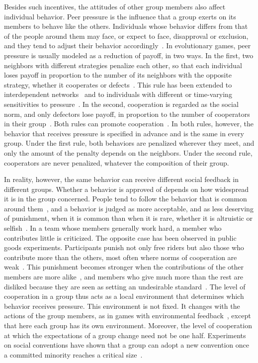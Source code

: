 \documentclass[%
  aip,cha,
  amsmath,amssymb,
  reprint,
  floatfix,
  article-title,
]{revtex4-2}
\begin{document}
Besides such incentives, the attitudes of other group members also affect individual behavior.
Peer pressure is the influence that a group exerts on its members to behave like the others.
Individuals whose behavior differs from that of the people around them may face, or expect to face, disapproval or exclusion, and they tend to adjust their behavior accordingly~\cite{asch1952social,cialdini2004social}.
In evolutionary games, peer pressure is usually modeled as a reduction of payoff, in two ways.
In the first, two neighbors with different strategies penalize each other, so that each individual loses payoff in proportion to the number of its neighbors with the opposite strategy, whether it cooperates or defects~\cite{yang2015peer}.
This rule has been extended to interdependent networks~\cite{hu2021peer} and to individuals with different or time-varying sensitivities to pressure~\cite{gao2023impact,ma2025evolution}.
In the second, cooperation is regarded as the social norm, and only defectors lose payoff, in proportion to the number of cooperators in their group~\cite{deng2018peer}.
Both rules can promote cooperation~\cite{yang2015peer,gao2023impact,deng2018peer}.
In both rules, however, the behavior that receives pressure is specified in advance and is the same in every group.
Under the first rule, both behaviors are penalized wherever they meet, and only the amount of the penalty depends on the neighbors.
Under the second rule, cooperators are never penalized, whatever the composition of their group.

In reality, however, the same behavior can receive different social feedback in different groups.
Whether a behavior is approved of depends on how widespread it is in the group concerned.
People tend to follow the behavior that is common around them~\cite{cialdini1990focus,cialdini2004social,szolnoki2015conformity,xu2026synergistic}, and a behavior is judged as more acceptable, and as less deserving of punishment, when it is common than when it is rare, whether it is altruistic or selfish~\cite{lindstrom2018common}.
In a team whose members generally work hard, a member who contributes little is criticized.
The opposite case has been observed in public goods experiments.
Participants punish not only free riders but also those who contribute more than the others, most often where norms of cooperation are weak~\cite{herrmann2008antisocial}.
This punishment becomes stronger when the contributions of the other members are more alike~\cite{irwin2013normative}, and members who give much more than the rest are disliked because they are seen as setting an undesirable standard~\cite{parks2010desire}.
The level of cooperation in a group thus acts as a local environment that determines which behavior receives pressure.
This environment is not fixed. It changes with the actions of the group members, as in games with environmental feedback~\cite{weitz2016oscillating,tilman2020evolutionary,wang2020eco,hu2025dynamic}, except that here each group has its own environment.
Moreover, the level of cooperation at which the expectations of a group change need not be one half. Experiments on social conventions have shown that a group can adopt a new convention once a committed minority reaches a critical size~\cite{centola2018experimental}.
\end{document}
